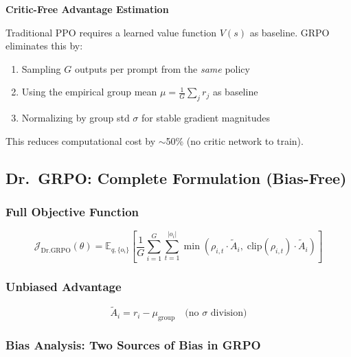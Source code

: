\documentclass[11pt,a4paper]{article}
\begin{document}
\begin{importantbox}
\textbf{Critic-Free Advantage Estimation}

Traditional PPO requires a learned value function $V(s)$ as baseline. GRPO eliminates this by:
\begin{enumerate}
    \item Sampling $G$ outputs per prompt from the \emph{same} policy
    \item Using the empirical group mean $\mu = \frac{1}{G}\sum_j r_j$ as baseline
    \item Normalizing by group std $\sigma$ for stable gradient magnitudes
\end{enumerate}
This reduces computational cost by $\sim$50\% (no critic network to train).
\end{importantbox}

\subsection{Dr.~GRPO: Complete Formulation (Bias-Free)}

\subsubsection{Full Objective Function}

\begin{equation}
\mathcal{J}_{\text{Dr.GRPO}}(\theta) = \mathbb{E}_{q, \{o_i\}} \left[ \frac{1}{G} \sum_{i=1}^{G} \sum_{t=1}^{|o_i|} \min\left( \rho_{i,t} \cdot \tilde{A}_i, \; \text{clip}(\rho_{i,t}) \cdot \tilde{A}_i \right) \right]
\end{equation}

\subsubsection{Unbiased Advantage}

\begin{equation}
\tilde{A}_i = r_i - \mu_{\text{group}} \quad \text{(no $\sigma$ division)}
\end{equation}

\subsubsection{Bias Analysis: Two Sources of Bias in GRPO}
\end{document}
